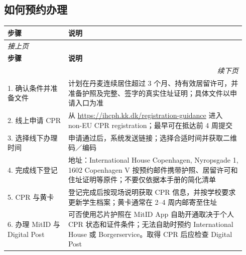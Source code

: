 \subsection{如何预约办理}

\small
\begin{longtable}{p{0.24\linewidth}p{0.70\linewidth}}
    \toprule
    \rowcolor{gray!10} %
    \textbf{步骤} & \textbf{说明} \\
    \midrule
    \endfirsthead
    \multicolumn{2}{l}{\textit{接上页}}\\
    \toprule
    \textbf{步骤} & \textbf{说明} \\
    \midrule
    \endhead
    \midrule\multicolumn{2}{r}{\textit{续下页}}\\\bottomrule
    \endfoot
    \bottomrule
    \endlastfoot

    1. 确认条件并准备文件 &
      计划在丹麦连续居住超过 3 个月、持有效居留许可，并准备护照及完整、签字的真实住址证明；具体文件以申请入口为准 \\

    2. 线上申请 CPR &
      从 \url{https://ihcph.kk.dk/registration-guidance} 进入 non-EU CPR registration；最早可在抵达前 4 周提交 \\

    3. 选择线下办理时间 &
      申请通过后，系统发送链接；选择合适时间并获取二维码／编码 \\

    4. 完成线下登记 &
      地址：International House Copenhagen, Nyropsgade 1, 1602 Copenhagen V \newline
      按预约邮件携带护照、居留许可和住址证明等原件；不要仅依据本手册的简化清单
 \\

    5. CPR 与黄卡 &
      登记完成后按现场说明获取 CPR 信息，并按学校要求更新学生档案；黄卡通常在 2--4 周内邮寄至住址 \\

    6. 办理 MitID 与 Digital Post &
      可否使用芯片护照在 MitID App 自助开通取决于个人 CPR 状态和证件条件；无法自助时预约 International House 或 Borgerservice。取得 CPR 后应检查 Digital Post \\
\end{longtable}
\normalsize

